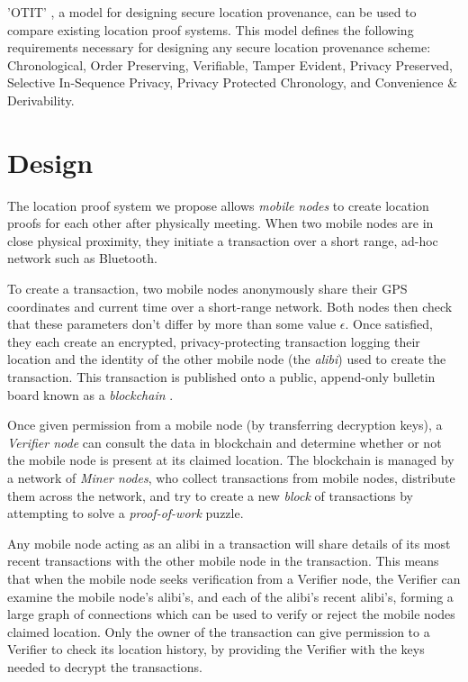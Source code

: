 \documentclass[12pt]{article}
\begin{document}
'OTIT' \cite{otit}, a model for designing secure location provenance, can be used to compare existing location proof systems. This model defines the following requirements necessary for designing any secure location provenance scheme: Chronological, Order Preserving, Verifiable, Tamper Evident, Privacy Preserved, Selective In-Sequence Privacy, Privacy Protected Chronology, and Convenience \& Derivability.

\newpage
\section{Design}
The location proof system we propose allows \textit{mobile nodes} to create location proofs for each other after physically meeting. When two mobile nodes are in close physical proximity, they initiate a transaction over a short range, ad-hoc network such as Bluetooth.

To create a transaction, two mobile nodes anonymously share their GPS coordinates and current time over a short-range network. Both nodes then check that these parameters don't differ by more than some value $\epsilon$. Once satisfied, they each create an encrypted, privacy-protecting transaction logging their location and the identity of the other mobile node (the \textit{alibi}) used to create the transaction. This transaction is published onto a public, append-only bulletin board known as a \textit{blockchain} \cite{blueprint}.

Once given permission from a mobile node (by transferring decryption keys), a \textit{Verifier node} can consult the data in blockchain and determine whether or not the mobile node is present at its claimed location. The blockchain is managed by a network of \textit{Miner nodes}, who collect transactions from mobile nodes, distribute them across the network, and try to create a new \textit{block} of transactions by attempting to solve a \textit{proof-of-work} puzzle.

Any mobile node acting as an alibi in a transaction will share details of its most recent transactions with the other mobile node in the transaction. This means that when the mobile node seeks verification from a Verifier node, the Verifier can examine the mobile node's alibi's, and each of the alibi's recent alibi's, forming a large graph of connections which can be used to verify or reject the mobile nodes claimed location. Only the owner of the transaction can give permission to a Verifier to check its location history, by providing the Verifier with the keys needed to decrypt the transactions.
\end{document}
